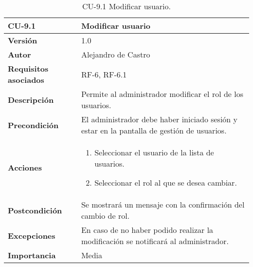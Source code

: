 \begin{table}[p]
	\centering
	\begin{tabularx}{\linewidth}{ p{} p{} }
		\toprule
		\textbf{CU-9.1}    & \textbf{Modificar usuario}\\
		\toprule
		\textbf{Versión}              & 1.0    \\
		\textbf{Autor}                & {Alejandro de Castro} \\
		\textbf{Requisitos asociados} & RF-6, RF-6.1 \\
		\textbf{Descripción}          & Permite al administrador modificar el rol de los usuarios. \\
		\textbf{Precondición}         & El administrador debe haber iniciado sesión y estar en la pantalla de gestión de usuarios. \\
        \textbf{Acciones}             &
		\begin{enumerate}
			\def\labelenumi{\arabic{enumi}.}
			\tightlist
            \item Seleccionar el usuario de la lista de usuarios.
			\item Seleccionar el rol al que se desea cambiar.
		\end{enumerate}\\ 
		\textbf{Postcondición}        & Se mostrará un mensaje con la confirmación del cambio de rol. \\
		\textbf{Excepciones}          & En caso de no haber podido realizar la modificación se notificará al administrador. \\
		\textbf{Importancia}          & Media \\
		\bottomrule
	\end{tabularx}
	\caption{CU-9.1 Modificar usuario.}
\end{table}

